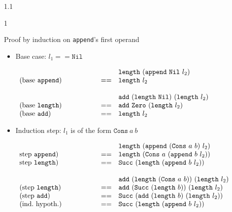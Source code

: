\documentclass{slides}
\newcommand{\blau}[1]{{\color{Blue} #1} \medskip }
\newenvironment{myslide}{\begin{slide}\color{Blue}\begin{boxedminipage}{1.1\hsize}\begin{boxedminipage}{1\hsize}\color{Black}
\vspace{-170\in}
}{%
\smallskip
\end{boxedminipage}
\end{boxedminipage}
\end{slide}}
\begin{document}
\begin{myslide}

\bigskip
\bigskip
\bigskip

\blau{Proof by induction on \texttt{append}'s first operand}

{

\tiny

\begin{itemize}
%
\item Base case: $l_1 == \texttt{Nil}$ 

$\begin{array}{p{1.5in}ll}
& & \texttt{length}\ (\texttt{append}\ \texttt{Nil}\ l_2)\\
\mbox{(base \texttt{append})}
& ==
& \texttt{length}\ l_2
\\
\mbox{}\\
& & \texttt{add}\ (\texttt{length}\ \texttt{Nil})\ (\texttt{length}\ l_2)\\
\mbox{(base \texttt{length})}
& ==
& \texttt{add}\ \texttt{Zero}\ (\texttt{length}\ l_2)
\\
\mbox{(base \texttt{add})}
& ==
& \texttt{length}\ l_2
\end{array}$

%
%
%
\item Induction step: $l_1$ is of the form $\texttt{Cons}\ a\ b$

$\begin{array}{p{1.5in}ll}
& & \texttt{length}\ (\texttt{append}\ (\texttt{Cons}\ a\ b)\ l_2)\\
\mbox{step \texttt{append})}
& ==
& \texttt{length}\ (\texttt{Cons}\ a\ (\texttt{append}\ b\ l_2))
\\
\mbox{step \texttt{length})}
& ==
& \texttt{Succ}\ (\texttt{length}\ (\texttt{append}\ b\ l_2))
\\
\mbox{}\\
& & \texttt{add}\ (\texttt{length}\ (\texttt{Cons}\ a\ b))\ (\texttt{length}\ l_2)\\
\mbox{(step \texttt{length})}
& ==
& \texttt{add}\ (\texttt{Succ}\ (\texttt{length}\ b))\ (\texttt{length}\ l_2)
\\
\mbox{(step \texttt{add})}
& ==
& \texttt{Succ}\ (\texttt{add}\ (\texttt{length}\ b)\ (\texttt{length}\ l_2))
\\
\mbox{(ind.\ hypoth.)}
& ==
& \texttt{Succ}\ (\texttt{length}\ (\texttt{append}\ b\ l_2))
\end{array}$

\end{itemize}

}

\end{myslide}
\end{document}
